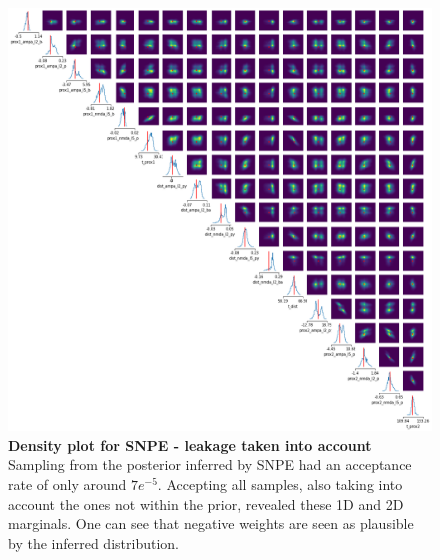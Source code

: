 \documentclass[12pt]{extreport}
\begin{document}
 \begin{figure}[h]
 \centering


        \includegraphics[width=0.90\linewidth]{images/thesis_fig6_6_leakage.png}


\caption{\label{app_leakage}\textbf{Density plot for SNPE - leakage taken into account} \small Sampling from the posterior inferred by SNPE had an acceptance rate of only around $7e^{-5}$. Accepting all samples, also taking into account the ones not within the prior, revealed these 1D and 2D marginals. One can see that negative weights are seen as plausible by the inferred distribution. }

 \end{figure}
 





\end{document}
